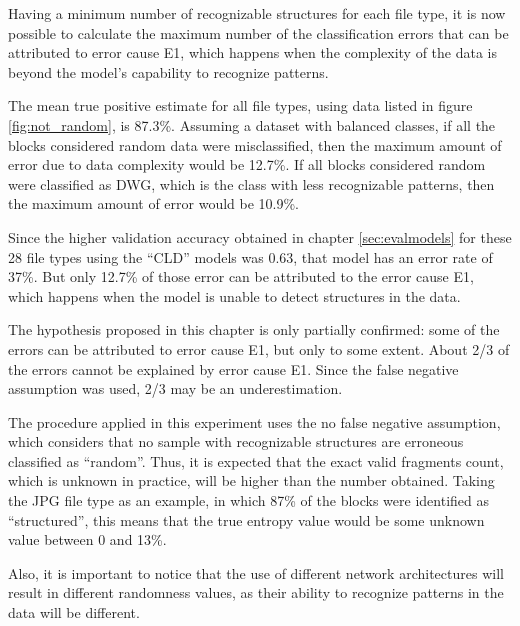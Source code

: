 Having a minimum number of recognizable structures for each file type, it is now possible to calculate the maximum number of the classification errors that can be attributed to error cause E1, which happens when the complexity of the data is beyond the model’s capability to recognize patterns.

The mean true positive estimate for all file types, using data listed in figure \ref{fig:not_random}, is 87.3\%.  Assuming a dataset with balanced classes, if all the blocks considered random data were misclassified, then the maximum amount of error due to data complexity would be 12.7\%. If all blocks considered random were classified as DWG, which is the class with less recognizable patterns, then the maximum amount of error would be 10.9\%.

Since the higher validation accuracy obtained in chapter \ref{sec:evalmodels} for these 28 file types using the ``CLD'' models was 0.63, that model has an error rate of 37\%. But only 12.7\% of those error can be attributed to the error cause E1, which happens when the model is unable to detect structures in the data.

The hypothesis proposed in this chapter is only partially confirmed: some of the errors can be attributed to error cause E1, but only to some extent. About 2/3 of the errors cannot be explained by error cause E1. Since the false negative assumption was used, 2/3 may be an underestimation.


The procedure applied in this experiment uses the no false negative assumption, which considers that no sample with recognizable structures are erroneous classified as ``random''. Thus, it is expected that the exact valid fragments count, which is unknown in practice, will be higher than the number obtained. Taking the JPG file type as an example, in which 87\% of the blocks were identified as ``structured'', this means that the true entropy value would be some unknown value between 0 and 13\%.

Also, it is important to notice that the use of different network architectures will result in different randomness values, as their ability to recognize patterns in the data will be different.